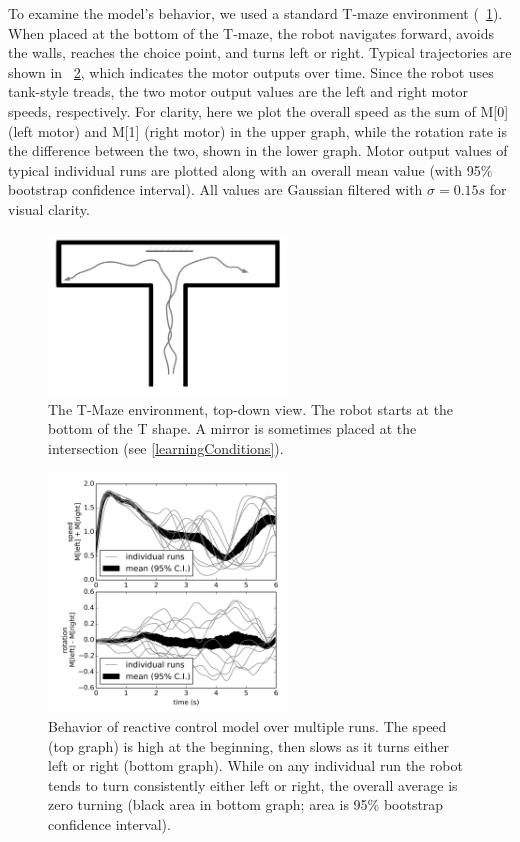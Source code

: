 \documentclass{frontiersSCNS}
\begin{document}
To examine the model's behavior, we used a standard T-maze
environment (\figurename~\ref{Tmaze}). When placed at the bottom
of the T-maze, the robot navigates forward, avoids the
walls, reaches the choice point, and turns left or right.
Typical trajectories are shown in \figurename~\ref{React}, which indicates
the motor outputs over time. Since the robot uses tank-style treads, the 
two motor output values are the left and right motor speeds, respectively. 
For clarity, here we plot the overall speed as the sum of M[0] (left motor) 
and M[1] (right motor) in the upper graph, while the rotation rate is the difference between the two,
shown in the lower graph. 
Motor output values of typical individual runs are plotted along with an overall 
mean value (with 95\% bootstrap confidence interval). All values are Gaussian 
filtered with $\sigma=0.15s$ for visual clarity.

\begin{figure}[!t]
\centering
\includegraphics[width=2.5in]{../figures/tmazeRev.pdf}
\caption{The T-Maze environment, top-down view. The robot starts at the bottom of the T shape.
A mirror is sometimes placed at the intersection (see \ref{learningConditions}).}
\label{Tmaze}
\end{figure}


\begin{figure}[!t]
\centering
\includegraphics[width=2.5in]{../figures/basic/basic.png}
\caption{Behavior of reactive control model over multiple runs. The speed (top graph) is high at the beginning, then slows as it turns either left or right (bottom graph). While on any individual run the robot tends to turn consistently either left or right, the overall average is zero turning (black area in bottom graph; area is 95\% bootstrap confidence interval).}
\label{React}
\end{figure}
\end{document}
